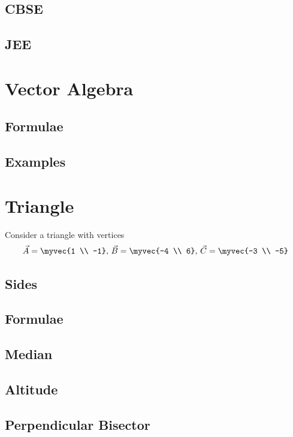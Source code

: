 \documentclass[journal]{IEEEtran}
\begin{document}
\subsection{CBSE}

\subsection{JEE}
 
%
\newpage
\section{Vector Algebra}
\subsection{Formulae}

\subsection{Examples}

\newpage
\appendices
\section{Triangle}
Consider a triangle with vertices
		\begin{align}
			\label{eq:app-tri-pts}
			\vec{A} = \myvec{1 \\ -1},\,
			\vec{B} = \myvec{-4 \\ 6},\,
			\vec{C} = \myvec{-3 \\ -5}
		\end{align}
\subsection{Sides}

\subsection{Formulae}

\subsection{Median}

\subsection{Altitude}

\subsection{Perpendicular Bisector}

\end{document}
